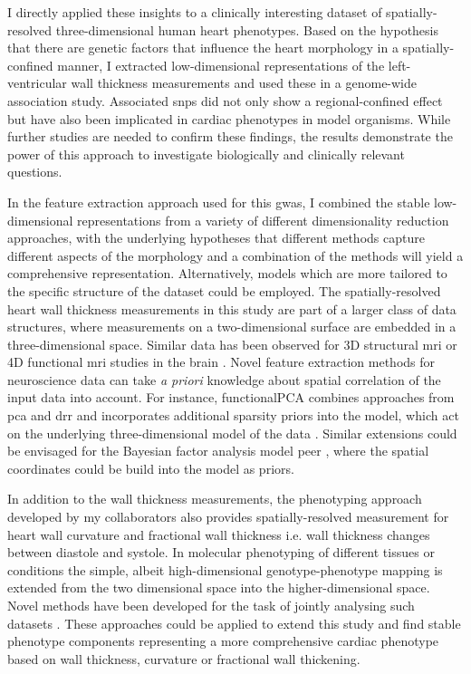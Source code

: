 I directly applied these insights to a clinically interesting dataset of spatially-resolved three-dimensional human heart phenotypes. Based on the hypothesis that there are genetic factors that influence the heart morphology in a spatially-confined manner, I extracted low-dimensional representations of the left-ventricular wall thickness measurements and used these in a genome-wide association study. Associated \glspl{snp} did not only show a regional-confined effect but have also been implicated in cardiac phenotypes in model organisms. While further studies are needed to confirm these findings, the results demonstrate the power of this approach to investigate biologically and clinically relevant questions.

In the feature extraction approach used for this \gls{gwas}, I combined the stable low-dimensional representations from a variety of different dimensionality reduction approaches, with the underlying hypotheses that different methods capture different aspects of the morphology and a combination of the methods will yield a comprehensive representation. Alternatively, models which are more tailored to the specific structure of the dataset could be employed. The spatially-resolved heart wall thickness measurements in this study are part of a larger class of data structures, where measurements on a two-dimensional surface are embedded in a three-dimensional space. Similar data has been observed for 3D structural \gls{mri} or 4D functional \gls{mri} studies in the brain \citep{vanEssen2012,Glasser2013}. Novel feature extraction methods for neuroscience data can take \textit{a priori} knowledge about spatial correlation of the input data into account. For instance, functionalPCA combines approaches from \gls{pca} and \gls{drr} and incorporates additional sparsity priors into the model, which act on the underlying three-dimensional model of the data \citep{Lila2016}. Similar extensions could be envisaged for the Bayesian factor analysis model \gls{peer} \citep{Stegle2012}, where the spatial coordinates could be build into the model as priors.

In addition to the wall thickness measurements, the phenotyping approach developed by my collaborators also provides spatially-resolved measurement for heart wall curvature and fractional wall thickness i.e. wall thickness changes between diastole and systole. In molecular phenotyping of different tissues or conditions the simple, albeit high-dimensional genotype-phenotype mapping is extended from the two dimensional  space into the higher-dimensional  space. Novel methods have been developed for the task of jointly analysing such datasets \citep{Hore2016}. These approaches could be applied to extend this study and find stable phenotype components representing a more comprehensive cardiac phenotype based on wall thickness, curvature or fractional wall thickening. 

